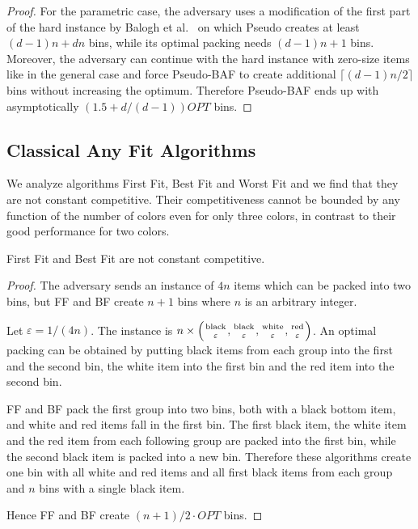 \documentclass[11pt,a4paper]{article}
\def\vari#1{\mathit{#1}}
\newcommand*{\nolinefrac}[2]{\genfrac{}{}{0pt}{1}{#1}{#2}}
\begin{document}
\begin{proof}
For the parametric case, the adversary uses a modification of the first part of the hard
instance by Balogh et al.~\cite{balogh14} on which Pseudo creates at least $(d - 1) n + dn$ bins,
while its optimal packing needs $(d - 1) n + 1$ bins.
Moreover, the adversary can continue with the hard instance with zero-size items
like in the general case and force Pseudo-BAF to create additional $\lceil (d - 1) n/2\rceil$ bins
without increasing the optimum. Therefore
Pseudo-BAF ends up with asymptotically $(1.5 + d/(d-1)) \vari{OPT}$ bins.
\end{proof}

\subsection{Classical Any Fit Algorithms} \label{sec:AFalgsOnColors}
We analyze algorithms First Fit, Best Fit and Worst Fit and we find that
they are not constant competitive.  Their competitiveness cannot be
bounded by any function of the number of colors even for only three
colors, in contrast to their good performance for two colors.

\begin{proposition}
First Fit and Best Fit are not constant competitive.
\end{proposition}

\begin{proof}
The adversary sends an instance of $4n$ items which can be packed into two bins,
but FF and BF create $n + 1$ bins where $n$ is an arbitrary integer.

Let $\varepsilon = 1/(4n)$. The instance is $n \times \left( \nolinefrac{\mathrm{black}}{\varepsilon}, \nolinefrac{\mathrm{black}}{\varepsilon},
\nolinefrac{\mathrm{white}}{\varepsilon}, \nolinefrac{\mathrm{red}}{\varepsilon} \right)$.
An optimal packing can be obtained by putting black items from each group into the first and the second bin,
the white item into the first bin and the red item into the second bin.

FF and BF pack the first group into two bins, both with a black bottom item,
and white and red items fall in the first bin.
The first black item, the white item and the red item from each following group are packed into the first bin,
while the second black item is packed into a new bin.
Therefore these algorithms create one bin with all white and red items and all first black items from each group and $n$ bins with a single black item.

Hence FF and BF create $(n+1)/2\cdot \vari{OPT}$ bins.
\end{proof}
\end{document}
